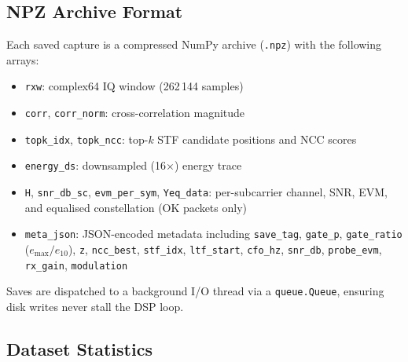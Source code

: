\documentclass[conference]{IEEEtran}
\begin{document}
\subsection{NPZ Archive Format}
\label{sec:npz}

Each saved capture is a compressed NumPy archive (\texttt{.npz}) with
the following arrays:

\begin{itemize}
\item \texttt{rxw}: complex64 IQ window (262\,144 samples)
\item \texttt{corr}, \texttt{corr\_norm}: cross-correlation magnitude
\item \texttt{topk\_idx}, \texttt{topk\_ncc}: top-$k$ STF candidate
  positions and NCC scores
\item \texttt{energy\_ds}: downsampled (16$\times$) energy trace
\item \texttt{H}, \texttt{snr\_db\_sc}, \texttt{evm\_per\_sym},
  \texttt{Yeq\_data}: per-subcarrier channel, SNR, EVM, and equalised
  constellation (OK packets only)
\item \texttt{meta\_json}: JSON-encoded metadata including
  \texttt{save\_tag}, \texttt{gate\_p}, \texttt{gate\_ratio}
  ($e_{\max}/e_{10}$), \texttt{z}, \texttt{ncc\_best},
  \texttt{stf\_idx}, \texttt{ltf\_start}, \texttt{cfo\_hz},
  \texttt{snr\_db}, \texttt{probe\_evm}, \texttt{rx\_gain}, \texttt{modulation}
\end{itemize}

Saves are dispatched to a background I/O thread via a \texttt{queue.Queue},
ensuring disk writes never stall the DSP loop.

\subsection{Dataset Statistics}
\label{sec:stats}
\end{document}
